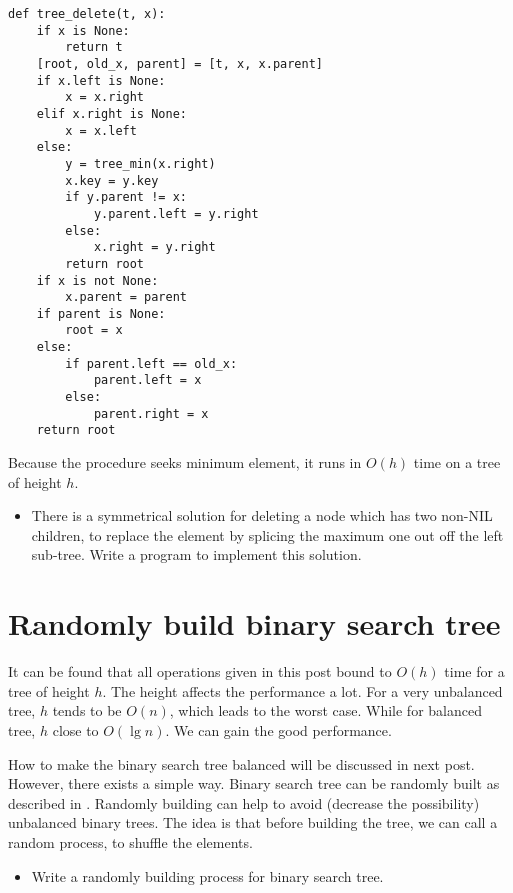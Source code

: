 \documentclass{article}
\begin{document}
\lstset{language=Python}
\begin{lstlisting}
def tree_delete(t, x):
    if x is None:
        return t
    [root, old_x, parent] = [t, x, x.parent]
    if x.left is None:
        x = x.right
    elif x.right is None:
        x = x.left
    else:
        y = tree_min(x.right)
        x.key = y.key
        if y.parent != x:
            y.parent.left = y.right
        else:
            x.right = y.right
        return root
    if x is not None:
        x.parent = parent
    if parent is None:
        root = x
    else:
        if parent.left == old_x:
            parent.left = x
        else:
            parent.right = x
    return root
\end{lstlisting}

Because the procedure seeks minimum element, it runs in $O(h)$ time on
a tree of height $h$.

\begin{Exercise}

\begin{itemize}
\item There is a symmetrical solution for deleting a node which has two
non-NIL children, to replace the element by splicing the maximum one out
off the left sub-tree. Write a program to implement this solution.
\end{itemize}

\end{Exercise}

\section{Randomly build binary search tree}
It can be found that all operations given in this post bound to $O(h)$
time for a tree of height $h$. The height affects the performance
a lot. For a very unbalanced tree, $h$ tends to be $O(n)$, which leads
to the worst case. While for balanced tree, $h$ close to $O(\lg n)$.
We can gain the good performance.

How to make the binary search tree
balanced will be discussed in next post. However, there exists a simple
way. Binary search tree can be randomly built as described in \cite{CLRS}.
Randomly building can help to avoid (decrease the possibility) unbalanced
binary trees. The idea is that before building the tree, we can call a random
process, to shuffle the elements.

\begin{Exercise}

\begin{itemize}
\item Write a randomly building process for binary search tree.
\end{itemize}

\end{Exercise}
\end{document}
